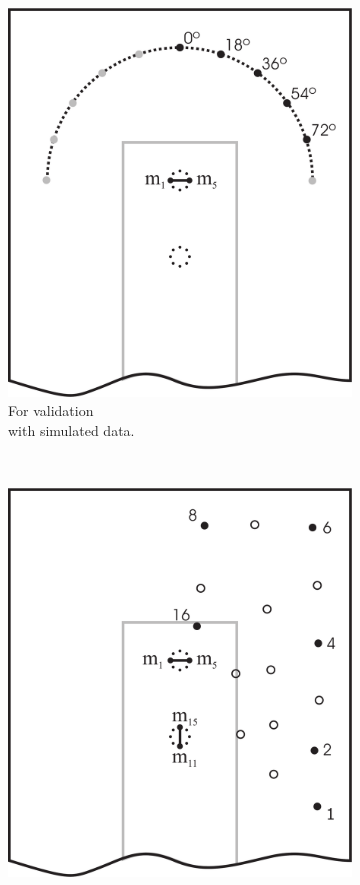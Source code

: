 \documentclass[spanish,openright]{book}
\begin{document}
\begin{figure}
  \centering
  \begin{subfigure}[t]{0.3\textwidth}
    \includegraphics[width=\textwidth]{angular2-short-improved}
    \caption{For validation\\with simulated data.}
    \label{fig:Simulated_positions}
  \end{subfigure}
~\begin{subfigure}[t]{0.3\textwidth}
    \includegraphics[width=\textwidth]{positions1-short-improved}

\end{subfigure}
\end{figure}
\end{document}
